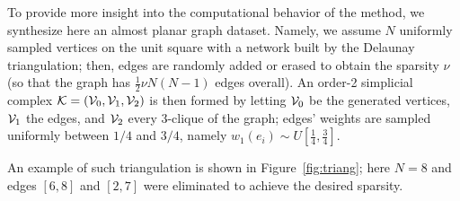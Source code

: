 To provide more insight into the computational behavior of the method, we synthesize here an almost planar 
graph dataset. Namely, we assume $N$ uniformly sampled vertices on the unit square with a network built by the Delaunay triangulation;  then, edges are randomly added or erased to obtain the sparsity $\nu$  (so that the graph has $\frac 12  \nu N(N-1)$ edges overall). An order-2 simplicial complex $\mathcal{K}=(\mathcal{V}_0,\mathcal{V}_1,\mathcal{V}_2)$  is then formed by letting $\mathcal{V}_0$ be the generated vertices, $\mathcal{V}_1$ the edges, and $\mathcal{V}_2$ every $3$-clique of the graph; edges' weights are sampled uniformly between $1/4$ and $3/4$, namely $w_1(e_i) \sim U [\frac{1}{4}, \frac{3}{4} ]$.


An  example of such triangulation is shown in Figure~\ref{fig:triang}; here $N=8$ and edges $[6, 8]$ and $[2, 7]$ were eliminated to achieve the desired sparsity.

